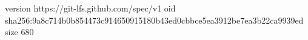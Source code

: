 version https://git-lfs.github.com/spec/v1
oid sha256:9a8c714b0b854473c914650915180b43ed0cbbce5ea3912be7ea3b22ca9939ed
size 680
